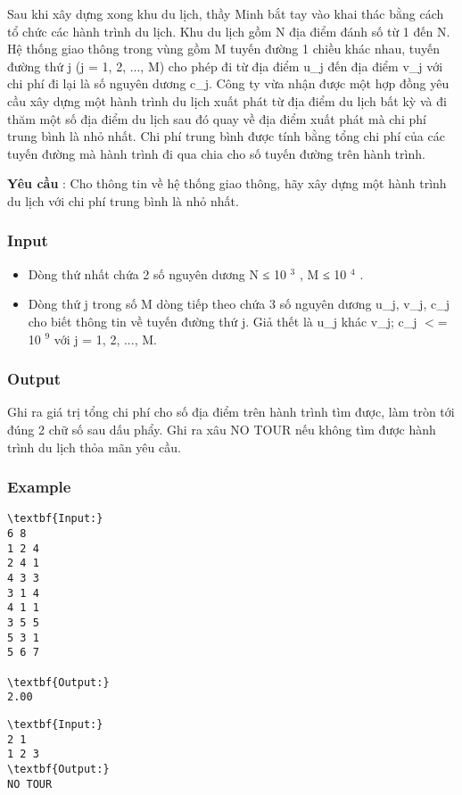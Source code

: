 



   Sau khi xây dựng xong khu du lịch, thầy Minh bắt tay vào khai thác bằng cách tổ chức các hành trình du lịch. Khu du lịch gồm N địa điểm đánh số từ 1 đến N. Hệ thống giao thông trong vùng gồm M tuyến đường 1 chiều khác nhau, tuyến đường thứ j (j = 1, 2, ..., M) cho phép đi từ địa điểm u\_j đến địa điểm v\_j với chi phí đi lại là số nguyên dương c\_j. Công ty vừa nhận được một hợp đồng yêu cầu xây dựng một hành trình du lịch xuất phát từ địa điểm du lịch bất kỳ và đi thăm một số địa điểm du lịch sau đó quay về địa điểm xuất phát mà chi phí trung bình là nhỏ nhất. Chi phí trung bình được tính bằng tổng chi phí của các tuyến đường mà hành trình đi qua chia cho số tuyến đường trên hành trình.  

\textbf{    Yêu cầu   }   : Cho thông tin về hệ thống giao thông, hãy xây dựng một hành trình du lịch với chi phí trung bình là nhỏ nhất.  

\subsubsection{   Input  }
\begin{itemize}
	\item     Dòng thứ nhất chứa 2 số nguyên dương N ≤ 10    $^     3    $    , M         ≤ 10     $^      4     $     .    
	\item      Dòng thứ j trong số M dòng tiếp theo chứa 3 số nguyên dương u\_j, v\_j, c\_j cho biết thông tin về tuyến đường thứ j. Giả thết là u\_j khác v\_j; c\_j $<$= 10     $^      9     $     với j = 1, 2, ..., M.    
\end{itemize}

\subsubsection{   Output  }

   Ghi ra giá trị tổng chi phí cho số địa điểm trên hành trình tìm được, làm tròn tới đúng 2 chữ số sau dấu phẩy. Ghi ra xâu NO TOUR nếu không tìm được hành trình du lịch thỏa mãn yêu cầu.  

\subsubsection{   Example  }
\begin{verbatim}
\textbf{Input:}
6 8
1 2 4 
2 4 1 
4 3 3 
3 1 4 
4 1 1 
3 5 5 
5 3 1 
5 6 7

\textbf{Output:}
2.00
\end{verbatim}


\begin{verbatim}
\textbf{Input:}
2 1
1 2 3
\textbf{Output:}
NO TOUR
\end{verbatim}